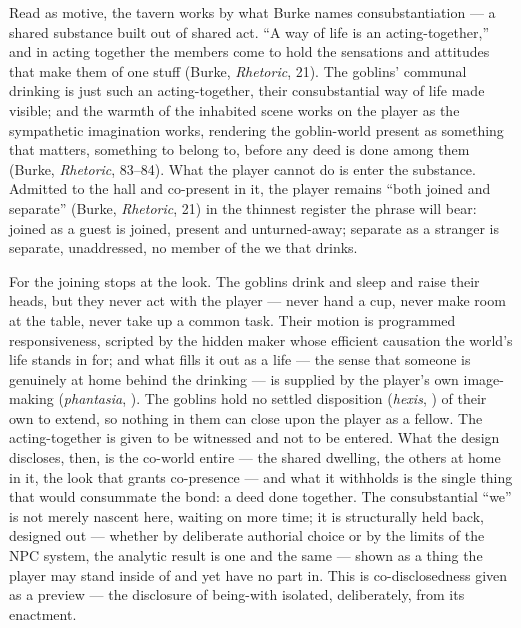 Read as motive, the tavern works by what Burke names consubstantiation — a shared substance built out of shared act. ``A way of life is an acting-together,'' and in acting together the members come to hold the sensations and attitudes that make them of one stuff (Burke, \textit{Rhetoric}, 21). The goblins' communal drinking is just such an acting-together, their consubstantial way of life made visible; and the warmth of the inhabited scene works on the player as the sympathetic imagination works, rendering the goblin-world present as something that matters, something to belong to, before any deed is done among them (Burke, \textit{Rhetoric}, 83–84). What the player cannot do is enter the substance. Admitted to the hall and co-present in it, the player remains ``both joined and separate'' (Burke, \textit{Rhetoric}, 21) in the thinnest register the phrase will bear: joined as a guest is joined, present and unturned-away; separate as a stranger is separate, unaddressed, no member of the we that drinks.

For the joining stops at the look. The goblins drink and sleep and raise their heads, but they never act with the player — never hand a cup, never make room at the table, never take up a common task. Their motion is programmed responsiveness, scripted by the hidden maker whose efficient causation the world's life stands in for; and what fills it out as a life — the sense that someone is genuinely at home behind the drinking — is supplied by the player's own image-making (\textit{phantasia}, ). The goblins hold no settled disposition (\textit{hexis}, ) of their own to extend, so nothing in them can close upon the player as a fellow. The acting-together is given to be witnessed and not to be entered. What the design discloses, then, is the co-world entire — the shared dwelling, the others at home in it, the look that grants co-presence — and what it withholds is the single thing that would consummate the bond: a deed done together. The consubstantial ``we'' is not merely nascent here, waiting on more time; it is structurally held back, designed out — whether by deliberate authorial choice or by the limits of the NPC system, the analytic result is one and the same — shown as a thing the player may stand inside of and yet have no part in. This is co-disclosedness given as a preview — the disclosure of being-with isolated, deliberately, from its enactment.

